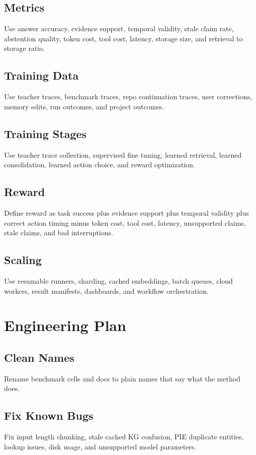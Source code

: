 \documentclass[11pt]{article}
\begin{document}
\subsection{Metrics}
Use answer accuracy, evidence support, temporal validity, stale claim rate, abstention quality, token cost, tool cost, latency, storage size, and retrieval to storage ratio.

\subsection{Training Data}
Use teacher traces, benchmark traces, repo continuation traces, user corrections, memory edits, run outcomes, and project outcomes.

\subsection{Training Stages}
Use teacher trace collection, supervised fine tuning, learned retrieval, learned consolidation, learned action choice, and reward optimization.

\subsection{Reward}
Define reward as task success plus evidence support plus temporal validity plus correct action timing minus token cost, tool cost, latency, unsupported claims, stale claims, and bad interruptions.

\subsection{Scaling}
Use resumable runners, sharding, cached embeddings, batch queues, cloud workers, result manifests, dashboards, and workflow orchestration.

\section{Engineering Plan}

\subsection{Clean Names}
Rename benchmark cells and docs to plain names that say what the method does.

\subsection{Fix Known Bugs}
Fix input length chunking, stale cached KG confusion, PIE duplicate entities, lookup issues, disk usage, and unsupported model parameters.
\end{document}
